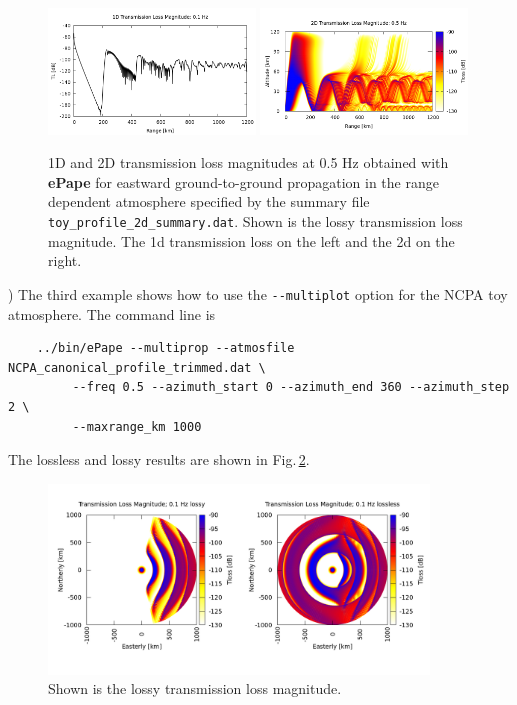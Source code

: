 \begin{figure}[h]
\begin{center}
\includegraphics[width=0.49\textwidth]{figs/ePape_ex2_1d}
\includegraphics[width=0.49\textwidth]{figs/ePape_ex2_2d}
\end{center}
\caption{1D and 2D transmission loss magnitudes at 0.5 Hz obtained with {\bf ePape} for eastward ground-to-ground propagation in the range dependent atmosphere specified by the summary file {\tt toy\_profile\_2d\_summary.dat}. Shown is the lossy transmission loss magnitude. The 1d transmission loss on the left and the 2d on the right.}
\label{fig: ePape ex2}
\end{figure}

) The third example shows how to use the \verb+--multiplot+ option for the NCPA toy atmosphere. The command line is
\begin{verbatim}
    ../bin/ePape --multiprop --atmosfile NCPA_canonical_profile_trimmed.dat \
         --freq 0.5 --azimuth_start 0 --azimuth_end 360 --azimuth_step 2 \
         --maxrange_km 1000
\end{verbatim}
The lossless and lossy results are shown in Fig.\,\ref{fig: ePape ex3}. 
         
\begin{figure}[h]
\begin{center}
\includegraphics[width=0.9\textwidth]{figs/ePape_ex3}
\end{center}
\caption{Shown is the lossy transmission loss magnitude.}
\label{fig: ePape ex3}
\end{figure}



